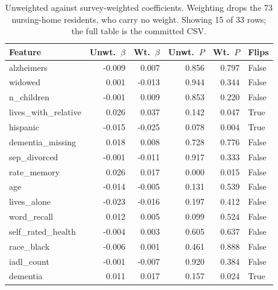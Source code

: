 \documentclass[9pt,twoside]{pnas-new}
\begin{document}
\begin{table}[!ht]
\centering
\caption{Unweighted against survey-weighted coefficients. Weighting drops the 73 nursing-home residents, who carry no weight. Showing 15 of 33 rows; the full table is the committed CSV.}
\label{tab:b-wtcoef}
\footnotesize
\begin{tabular}{lrrrrl}
\toprule
Feature & Unwt.\ $\beta$ & Wt.\ $\beta$ & Unwt.\ $P$ & Wt.\ $P$ & Flips \\
\midrule
alzheimers & -0.009 & 0.007 & 0.856 & 0.797 & False \\
widowed & 0.001 & -0.013 & 0.944 & 0.344 & False \\
n\_children & -0.001 & 0.009 & 0.853 & 0.220 & False \\
lives\_with\_relative & 0.026 & 0.037 & 0.142 & 0.047 & True \\
hispanic & -0.015 & -0.025 & 0.078 & 0.004 & True \\
dementia\_missing & 0.018 & 0.008 & 0.728 & 0.776 & False \\
sep\_divorced & -0.001 & -0.011 & 0.917 & 0.333 & False \\
rate\_memory & 0.026 & 0.017 & 0.000 & 0.015 & False \\
age & -0.014 & -0.005 & 0.131 & 0.539 & False \\
lives\_alone & -0.023 & -0.016 & 0.197 & 0.412 & False \\
word\_recall & 0.012 & 0.005 & 0.099 & 0.524 & False \\
self\_rated\_health & -0.004 & 0.003 & 0.605 & 0.637 & False \\
race\_black & -0.006 & 0.001 & 0.461 & 0.888 & False \\
iadl\_count & -0.001 & -0.007 & 0.920 & 0.384 & False \\
dementia & 0.011 & 0.017 & 0.157 & 0.024 & True \\
\bottomrule
\end{tabular}
\end{table}
\end{document}
